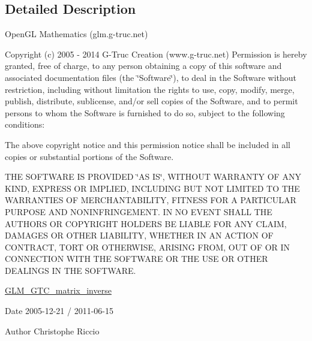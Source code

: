 \subsection{Detailed Description}
Open\-G\-L Mathematics (glm.\-g-\/truc.\-net)

Copyright (c) 2005 -\/ 2014 G-\/\-Truc Creation (www.\-g-\/truc.\-net) Permission is hereby granted, free of charge, to any person obtaining a copy of this software and associated documentation files (the \char`\"{}\-Software\char`\"{}), to deal in the Software without restriction, including without limitation the rights to use, copy, modify, merge, publish, distribute, sublicense, and/or sell copies of the Software, and to permit persons to whom the Software is furnished to do so, subject to the following conditions\-:

The above copyright notice and this permission notice shall be included in all copies or substantial portions of the Software.

T\-H\-E S\-O\-F\-T\-W\-A\-R\-E I\-S P\-R\-O\-V\-I\-D\-E\-D \char`\"{}\-A\-S I\-S\char`\"{}, W\-I\-T\-H\-O\-U\-T W\-A\-R\-R\-A\-N\-T\-Y O\-F A\-N\-Y K\-I\-N\-D, E\-X\-P\-R\-E\-S\-S O\-R I\-M\-P\-L\-I\-E\-D, I\-N\-C\-L\-U\-D\-I\-N\-G B\-U\-T N\-O\-T L\-I\-M\-I\-T\-E\-D T\-O T\-H\-E W\-A\-R\-R\-A\-N\-T\-I\-E\-S O\-F M\-E\-R\-C\-H\-A\-N\-T\-A\-B\-I\-L\-I\-T\-Y, F\-I\-T\-N\-E\-S\-S F\-O\-R A P\-A\-R\-T\-I\-C\-U\-L\-A\-R P\-U\-R\-P\-O\-S\-E A\-N\-D N\-O\-N\-I\-N\-F\-R\-I\-N\-G\-E\-M\-E\-N\-T. I\-N N\-O E\-V\-E\-N\-T S\-H\-A\-L\-L T\-H\-E A\-U\-T\-H\-O\-R\-S O\-R C\-O\-P\-Y\-R\-I\-G\-H\-T H\-O\-L\-D\-E\-R\-S B\-E L\-I\-A\-B\-L\-E F\-O\-R A\-N\-Y C\-L\-A\-I\-M, D\-A\-M\-A\-G\-E\-S O\-R O\-T\-H\-E\-R L\-I\-A\-B\-I\-L\-I\-T\-Y, W\-H\-E\-T\-H\-E\-R I\-N A\-N A\-C\-T\-I\-O\-N O\-F C\-O\-N\-T\-R\-A\-C\-T, T\-O\-R\-T O\-R O\-T\-H\-E\-R\-W\-I\-S\-E, A\-R\-I\-S\-I\-N\-G F\-R\-O\-M, O\-U\-T O\-F O\-R I\-N C\-O\-N\-N\-E\-C\-T\-I\-O\-N W\-I\-T\-H T\-H\-E S\-O\-F\-T\-W\-A\-R\-E O\-R T\-H\-E U\-S\-E O\-R O\-T\-H\-E\-R D\-E\-A\-L\-I\-N\-G\-S I\-N T\-H\-E S\-O\-F\-T\-W\-A\-R\-E.

\hyperlink{group__gtc__matrix__inverse}{G\-L\-M\-\_\-\-G\-T\-C\-\_\-matrix\-\_\-inverse}

\begin{DoxyDate}{Date}
2005-\/12-\/21 / 2011-\/06-\/15 
\end{DoxyDate}
\begin{DoxyAuthor}{Author}
Christophe Riccio 
\end{DoxyAuthor}
